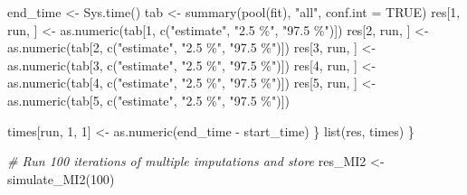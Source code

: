 \documentclass[
]{article}
\newenvironment{Shaded}{\begin{snugshade}}{\end{snugshade}}
\newcommand{\AttributeTok}[1]{\textcolor[rgb]{0.77,0.63,0.00}{#1}}
\newcommand{\CommentTok}[1]{\textcolor[rgb]{0.56,0.35,0.01}{\textit{#1}}}
\newcommand{\ConstantTok}[1]{\textcolor[rgb]{0.00,0.00,0.00}{#1}}
\newcommand{\DecValTok}[1]{\textcolor[rgb]{0.00,0.00,0.81}{#1}}
\newcommand{\FunctionTok}[1]{\textcolor[rgb]{0.00,0.00,0.00}{#1}}
\newcommand{\NormalTok}[1]{#1}
\newcommand{\OtherTok}[1]{\textcolor[rgb]{0.56,0.35,0.01}{#1}}
\newcommand{\SpecialCharTok}[1]{\textcolor[rgb]{0.00,0.00,0.00}{#1}}
\newcommand{\StringTok}[1]{\textcolor[rgb]{0.31,0.60,0.02}{#1}}
\begin{document}
\begin{Shaded}
\begin{Highlighting}[]
\NormalTok{    end\_time }\OtherTok{\textless{}{-}} \FunctionTok{Sys.time}\NormalTok{()}
\NormalTok{    tab }\OtherTok{\textless{}{-}} \FunctionTok{summary}\NormalTok{(}\FunctionTok{pool}\NormalTok{(fit), }\StringTok{"all"}\NormalTok{, }\AttributeTok{conf.int =} \ConstantTok{TRUE}\NormalTok{)  }
\NormalTok{    res[}\DecValTok{1}\NormalTok{, run, ] }\OtherTok{\textless{}{-}} \FunctionTok{as.numeric}\NormalTok{(tab[}\DecValTok{1}\NormalTok{, }\FunctionTok{c}\NormalTok{(}\StringTok{"estimate"}\NormalTok{, }\StringTok{"2.5 \%"}\NormalTok{, }\StringTok{"97.5 \%"}\NormalTok{)])  }
\NormalTok{    res[}\DecValTok{2}\NormalTok{, run, ] }\OtherTok{\textless{}{-}} \FunctionTok{as.numeric}\NormalTok{(tab[}\DecValTok{2}\NormalTok{, }\FunctionTok{c}\NormalTok{(}\StringTok{"estimate"}\NormalTok{, }\StringTok{"2.5 \%"}\NormalTok{, }\StringTok{"97.5 \%"}\NormalTok{)])}
\NormalTok{    res[}\DecValTok{3}\NormalTok{, run, ] }\OtherTok{\textless{}{-}} \FunctionTok{as.numeric}\NormalTok{(tab[}\DecValTok{3}\NormalTok{, }\FunctionTok{c}\NormalTok{(}\StringTok{"estimate"}\NormalTok{, }\StringTok{"2.5 \%"}\NormalTok{, }\StringTok{"97.5 \%"}\NormalTok{)])}
\NormalTok{    res[}\DecValTok{4}\NormalTok{, run, ] }\OtherTok{\textless{}{-}} \FunctionTok{as.numeric}\NormalTok{(tab[}\DecValTok{4}\NormalTok{, }\FunctionTok{c}\NormalTok{(}\StringTok{"estimate"}\NormalTok{, }\StringTok{"2.5 \%"}\NormalTok{, }\StringTok{"97.5 \%"}\NormalTok{)])}
\NormalTok{    res[}\DecValTok{5}\NormalTok{, run, ] }\OtherTok{\textless{}{-}} \FunctionTok{as.numeric}\NormalTok{(tab[}\DecValTok{5}\NormalTok{, }\FunctionTok{c}\NormalTok{(}\StringTok{"estimate"}\NormalTok{, }\StringTok{"2.5 \%"}\NormalTok{, }\StringTok{"97.5 \%"}\NormalTok{)])}
    
\NormalTok{    times[run, }\DecValTok{1}\NormalTok{, }\DecValTok{1}\NormalTok{] }\OtherTok{\textless{}{-}} \FunctionTok{as.numeric}\NormalTok{(end\_time }\SpecialCharTok{{-}}\NormalTok{ start\_time)}
\NormalTok{  \}}
  \FunctionTok{list}\NormalTok{(res, times)}
\NormalTok{\}}
\end{Highlighting}
\end{Shaded}

\begin{Shaded}
\begin{Highlighting}[]
\CommentTok{\# Run 100 iterations of multiple imputations and store}
\NormalTok{res\_MI2 }\OtherTok{\textless{}{-}} \FunctionTok{simulate\_MI2}\NormalTok{(}\DecValTok{100}\NormalTok{)}
\end{Highlighting}
\end{Shaded}
\end{document}
